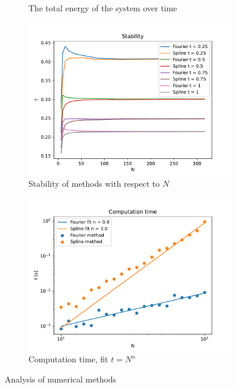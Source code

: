 \documentclass[12pt, a4paper]{article}
\begin{document}
\begin{figure}[hbtp]
\begin{subfigure}{0.5\textwidth}
  \caption{The total energy of the system over time} \label{fig:d}
  \end{subfigure} 
  \medskip
  \begin{subfigure}{0.5\textwidth}
  \includegraphics[width=\linewidth]{graphs/2_analysis/stability.pdf}
  \caption{Stability of methods with respect to $N$} \label{fig:a}
  \end{subfigure}
  \hspace*{\fill}
  \begin{subfigure}{0.5\textwidth}
  \includegraphics[width=\linewidth]{graphs/2_analysis/time.pdf}
  \caption{Computation time, fit $t = N^n$} \label{fig:b}
  \end{subfigure}
  \caption{Analysis of numerical methods} \label{fig:1}
\end{figure}
\end{document}
